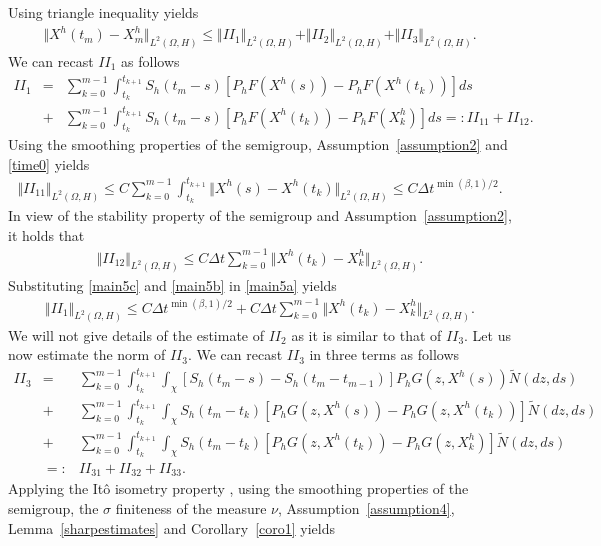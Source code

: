 \documentclass[review,12pt]{elsarticle}
\newcommand{\lemref}[1]{{Lemma~\ref{#1}}}
\newcommand{\assref}[1]{{Assumption~\ref{#1}}}
\newcommand{\coref}[1]{{Corollary~\ref{#1}}}
\begin{document}
Using triangle inequality yields
\begin{eqnarray}
\label{main4}
\Vert X^h(t_m)-X^h_m\Vert_{L^2(\Omega, H)}\leq \Vert II_1\Vert_{L^2(\Omega, H)}+\Vert II_2\Vert_{L^2(\Omega, H)}+\Vert II_3\Vert_{L^2(\Omega, H)}.
\end{eqnarray}
We can recast $II_1$ as follows
\begin{eqnarray}
\label{main5a}
II_1&=&\sum_{k=0}^{m-1}\int_{t_k}^{t_{k+1}}S_h(t_{m}-s)[P_hF(X^h(s))-P_hF(X^h(t_k))]ds\nonumber\\
&+&\sum_{k=0}^{m-1}\int_{t_k}^{t_{k+1}}S_h(t_{m}-s)[P_hF(X^h(t_k))-P_hF(X^h_k)]ds=:II_{11}+II_{12}.
\end{eqnarray}
Using the smoothing properties of the semigroup, \assref{assumption2} and \eqref{time0} yields
\begin{eqnarray}
\label{main5b}
\Vert II_{11}\Vert_{L^2(\Omega, H)}\leq C\sum_{k=0}^{m-1}\int_{t_k}^{t_{k+1}}\Vert X^h(s)-X^h(t_k)\Vert_{L^2(\Omega, H)}\leq C\Delta t^{\min(\beta, 1)/2}.
\end{eqnarray}
In view of the stability property of the semigroup and \assref{assumption2}, it holds that
\begin{eqnarray}
\label{main5c}
\Vert II_{12}\Vert_{L^2(\Omega, H)}\leq C\Delta t\sum_{k=0}^{m-1}\Vert X^h(t_k)-X^h_k\Vert_{L^2(\Omega, H)}.
\end{eqnarray}
Substituting \eqref{main5c} and \eqref{main5b} in \eqref{main5a} yields
\begin{eqnarray}
\label{main5}
\Vert II_1\Vert_{L^2(\Omega, H)}\leq C\Delta t^{\min(\beta, 1)/2}+C\Delta t\sum_{k=0}^{m-1}\Vert X^h(t_k)-X^h_k\Vert_{L^2(\Omega, H)}.
\end{eqnarray}
We will not give details of the estimate of $II_2$ as it is similar to that  of $II_3$.
Let us now  estimate the norm of $II_3$. We can recast $II_3$ in three terms as follows
\begin{eqnarray}
\label{main6a}
II_3&=&\sum_{k=0}^{m-1}\int_{t_k}^{t_{k+1}}\int_{\chi}\left[S_h(t_{m}-s)-S_h(t_{m}-t_{m-1})\right]P_hG(z, X^h(s))\widetilde{N}(dz, ds)\nonumber\\
&+&\sum_{k=0}^{m-1}\int_{t_k}^{t_{k+1}}\int_{\chi}S_h(t_m-t_k)[P_hG(z, X^h(s))-P_hG(z, X^h(t_k))]\widetilde{N}(dz, ds)\nonumber\\
&+& \sum_{k=0}^{m-1}\int_{t_k}^{t_{k+1}}\int_{\chi}S_h(t_m-t_k)[P_hG(z, X^h(t_k))-P_hG(z, X^h_k)]\widetilde{N}(dz, ds)\nonumber\\
&=:&II_{31}+II_{32}+II_{33}.
\end{eqnarray} 
Applying the It\^{o} isometry property \cite[(3.5.6)]{Rudiger}, using the smoothing properties of the semigroup, the $\sigma$ finiteness of the measure $\nu$, \assref{assumption4}, \lemref{sharpestimates} and \coref{coro1} yields
\end{document}
